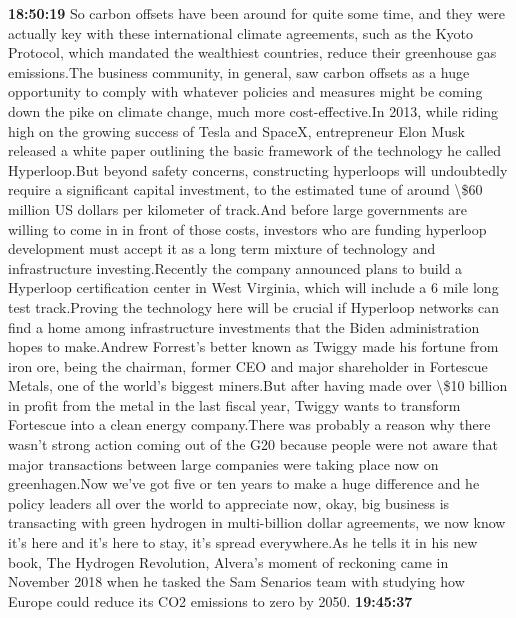 \documentclass{article}%
\begin{document}
\textbf{18:50:19}%
\newline%
So carbon offsets have been around for quite some time, and they were actually key with these international climate agreements, such as the Kyoto Protocol, which mandated the wealthiest countries, reduce their greenhouse gas emissions.The business community, in general, saw carbon offsets as a huge opportunity to comply with whatever policies and measures might be coming down the pike on climate change, much more cost{-}effective.In 2013, while riding high on the growing success of Tesla and SpaceX, entrepreneur Elon Musk released a white paper outlining the basic framework of the technology he called Hyperloop.But beyond safety concerns, constructing hyperloops will undoubtedly require a significant capital investment, to the estimated tune of around \textbackslash{}\$60 million US dollars per kilometer of track.And before large governments are willing to come in in front of those costs, investors who are funding hyperloop development must accept it as a long term mixture of technology and infrastructure investing.Recently the company announced plans to build a Hyperloop certification center in West Virginia, which will include a 6 mile long test track.Proving the technology here will be crucial if Hyperloop networks can find a home among infrastructure investments that the Biden administration hopes to make.Andrew Forrest's better known as Twiggy made his fortune from iron ore, being the chairman, former CEO and major shareholder in Fortescue Metals, one of the world's biggest miners.But after having made over \textbackslash{}\$10 billion in profit from the metal in the last fiscal year, Twiggy wants to transform Fortescue into a clean energy company.There was probably a reason why there wasn't strong action coming out of the G20 because people were not aware that major transactions between large companies were taking place now on greenhagen.Now we've got five or ten years to make a huge difference and he policy leaders all over the world to appreciate now, okay, big business is transacting with green hydrogen in multi{-}billion dollar agreements, we now know it's here and it's here to stay, it's spread everywhere.As he tells it in his new book, The Hydrogen Revolution, Alvera's moment of reckoning came in November 2018 when he tasked the Sam Senarios team with studying how Europe could reduce its CO2 emissions to zero by 2050.%
\textbf{19:45:37}%
\newline%
\end{document}
